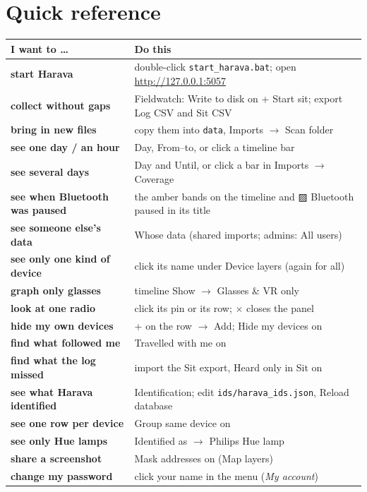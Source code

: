 \documentclass[10pt,a4paper]{article}
\newcommand{\ui}[1]{\textsf{\small #1}}            %
\begin{document}
\section{Quick reference}\label{sec:quick}
\begin{table}[H]\small\centering
\begin{tabularx}{\textwidth}{>{\bfseries}p{4.2cm}X}
\toprule
I want to \dots & Do this\\
\midrule
start Harava & double-click \texttt{start\_harava.bat}; open \url{http://127.0.0.1:5057}\\
collect without gaps & Fieldwatch: \ui{Write to disk} on + \ui{Start sit}; export Log CSV and Sit CSV\\
bring in new files & copy them into \texttt{data}, \ui{Imports $\rightarrow$ Scan folder}\\
see one day / an hour & \ui{Day}, \ui{From--to}, or click a timeline bar\\
see several days & \ui{Day} and \ui{Until}, or click a bar in \ui{Imports $\rightarrow$ Coverage}\\
see when Bluetooth was paused & the amber bands on the timeline and \ui{▨ Bluetooth paused} in its title\\
see someone else's data & \ui{Whose data} (shared imports; admins: \ui{All users})\\
see only one kind of device & click its name under \ui{Device layers} (again for all)\\
graph only glasses & timeline \ui{Show $\rightarrow$ Glasses \& VR only}\\
look at one radio & click its pin or its row; \ui{$\times$} closes the panel\\
hide my own devices & \ui{+} on the row $\rightarrow$ \ui{Add}; \ui{Hide my devices} on\\
find what followed me & \ui{Travelled with me} on\\
find what the log missed & import the Sit export, \ui{Heard only in Sit} on\\
see what Harava identified & \ui{Identification}; edit \texttt{ids/harava\_ids.json}, \ui{Reload database}\\
see one row per device & \ui{Group same device} on\\
see only Hue lamps & \ui{Identified as $\rightarrow$ Philips Hue lamp}\\
share a screenshot & \ui{Mask addresses} on (Map layers)\\
change my password & click your name in the menu (\emph{My account})\\

\end{tabularx}
\end{table}
\end{document}
